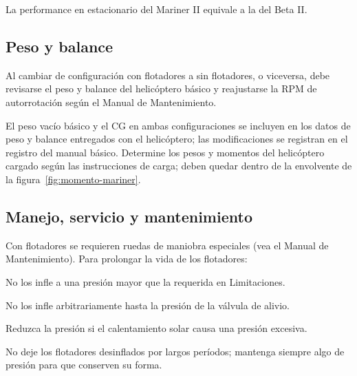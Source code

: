 
La performance en estacionario del Mariner II equivale a la del Beta II.

\subsection{Peso y balance}

\begin{precaucion}
Al cambiar de configuración con flotadores a sin flotadores, o viceversa, debe revisarse el peso y balance del helicóptero básico y reajustarse la RPM de autorrotación según el Manual de Mantenimiento.
\end{precaucion}

El peso vacío básico y el CG en ambas configuraciones se incluyen en los datos de peso y balance entregados con el helicóptero; las modificaciones se registran en el registro del manual básico. Determine los pesos y momentos del helicóptero cargado según las instrucciones de carga; deben quedar dentro de la envolvente de la figura~\ref{fig:momento-mariner}.


\subsection{Manejo, servicio y mantenimiento}

Con flotadores se requieren ruedas de maniobra especiales (vea el Manual de Mantenimiento). Para prolongar la vida de los flotadores:

\begin{pasos}
\item No los infle a una presión mayor que la requerida en Limitaciones.
\item No los infle arbitrariamente hasta la presión de la válvula de alivio.
\item Reduzca la presión si el calentamiento solar causa una presión excesiva.
\item No deje los flotadores desinflados por largos períodos; mantenga siempre algo de presión para que conserven su forma.
\end{pasos}

